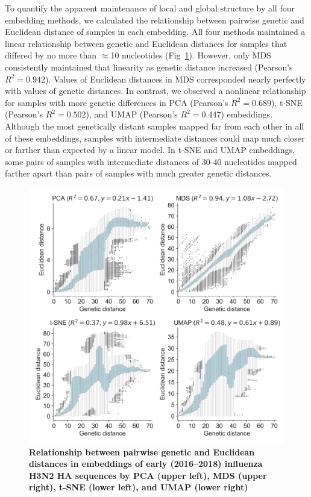 \documentclass[10pt,letterpaper]{article}
\begin{document}
To quantify the apparent maintenance of local and global structure by all four embedding methods, we calculated the relationship between pairwise genetic and Euclidean distance of samples in each embedding.
All four methods maintained a linear relationship between genetic and Euclidean distances for samples that differed by no more than $\approx$10 nucleotides (Fig~\ref{fig:seasonal-influenza-h3n2-ha-pairwise-distances}).
However, only MDS consistently maintained that linearity as genetic distance increased (Pearson's $R^{2} = 0.942$).
Values of Euclidean distances in MDS corresponded nearly perfectly with values of genetic distances.
In contrast, we observed a nonlinear relationship for samples with more genetic differences in PCA (Pearson's $R^{2} = 0.689$), t-SNE (Pearson's $R^{2} = 0.502$), and UMAP (Pearson's $R^{2} = 0.447$) embeddings.
Although the most genetically distant samples mapped far from each other in all of these embeddings, samples with intermediate distances could map much closer or farther than expected by a linear model.
In t-SNE and UMAP embeddings, some pairs of samples with intermediate distances of 30-40 nucleotides mapped farther apart than pairs of samples with much greater genetic distances.

\begin{figure}[!h]
\includegraphics[width=\columnwidth]{figures/flu-2016-2018-ha-euclidean-distance-by-genetic-distance.png}
\caption{{\bf Relationship between pairwise genetic and Euclidean distances in embeddings of early (2016--2018) influenza H3N2 HA sequences by PCA (upper left), MDS (upper right), t-SNE (lower left), and UMAP (lower right)}}
\label{fig:seasonal-influenza-h3n2-ha-pairwise-distances}
\end{figure}
\end{document}
